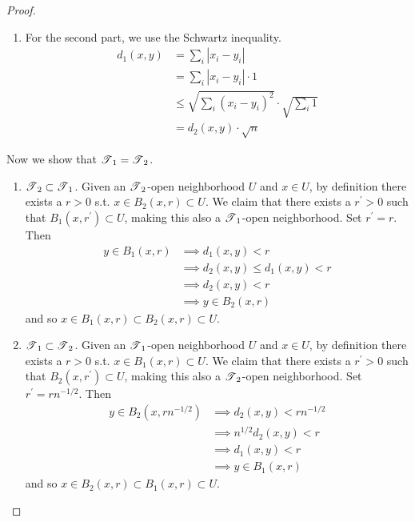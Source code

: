 \begin{proof}
\begin{enumerate}
          \item For the second part, we use the Schwartz inequality. 
          \begin{align}
            d_1 (x, y) & = \sum_i |x_i - y_i| \\ 
                       & = \sum_i |x_i - y_i| \cdot 1 \\
                       & \leq \sqrt{\sum_i (x_i - y_i)^2} \cdot \sqrt{\sum_i 1} \\
                       & = d_2 (x, y) \cdot \sqrt{n}
          \end{align}
        \end{enumerate}
        Now we show that $\T_1 = \T_2$. 
        \begin{enumerate} 
          \item $\T_2 \subset \T_1$. Given an $\T_2$-open neighborhood $U$ and $x \in U$, by definition there exists a $r > 0$ s.t. $x \in B_2 (x, r) \subset U$. We claim that there exists a $r^\prime > 0$ such that $B_1 (x, r^\prime) \subset U$, making this also a $\T_1$-open neighborhood. Set $r^\prime = r$. Then 
          \begin{align}
            y \in B_1 (x, r) & \implies d_1 (x, y) < r \\
                             & \implies d_2 (x, y) \leq d_1 (x, y) < r \\
                             & \implies d_2 (x, y) < r \\
                             & \implies y \in B_2 (x, r)
          \end{align}
          and so $x \in B_1 (x, r) \subset B_2 (x, r) \subset U$. 

          \item $\T_1 \subset \T_2$. Given an $\T_1$-open neighborhood $U$ and $x \in U$, by definition there exists a $r > 0$ s.t. $x \in B_1 (x, r) \subset U$. We claim that there exists a $r^\prime > 0$ such that $B_2 (x, r^\prime) \subset U$, making this also a $\T_2$-open neighborhood. Set $r^\prime = r n^{-1/2}$. Then 
          \begin{align}
            y \in B_2 (x, r n^{-1/2}) & \implies d_2 (x, y) < r n^{-1/2} \\
                                      & \implies n^{1/2} d_2 (x, y) < r \\ 
                                      & \implies d_1 (x, y) < r \\
                                      & \implies y \in B_1 (x, r) 
          \end{align}
          and so $x \in B_2 (x, r) \subset B_1 (x, r) \subset U$. 
        \end{enumerate}  
      \end{proof}

